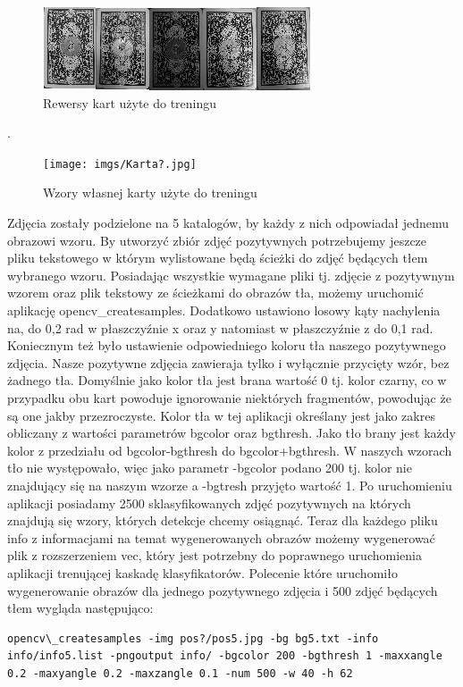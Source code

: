 \begin{figure}[H]
\centering
\includegraphics[scale=1.0]{imgs/RewersyKarty.jpg}
\caption{Rewersy kart użyte do treningu}
\label{fig:KartaRewers}
\end{figure}
.

\begin{figure}[H]
\centering
\texttt{[image: imgs/Karta?.jpg]}
\caption{Wzory własnej karty użyte do treningu}
\label{fig:KartaTajemnicza}
\end{figure}

Zdjęcia zostały podzielone na 5 katalogów, by każdy z nich odpowiadał jednemu obrazowi wzoru. By utworzyć zbiór zdjęć pozytywnych potrzebujemy jeszcze pliku tekstowego w którym wylistowane będą ścieżki do zdjęć będących tłem wybranego wzoru. Posiadając wszystkie wymagane pliki tj. zdjęcie z pozytywnym wzorem oraz plik tekstowy ze ścieżkami do obrazów tła, możemy uruchomić aplikację opencv\_createsamples. Dodatkowo ustawiono losowy kąty nachylenia na, do 0,2 rad w płaszczyźnie x oraz y natomiast w płaszczyźnie z do 0,1 rad. Koniecznym też było ustawienie odpowiedniego koloru tła naszego pozytywnego zdjęcia. Nasze pozytywne zdjęcia zawieraja tylko i wyłącznie przycięty wzór, bez żadnego tła. Domyślnie jako kolor tła jest brana wartość 0 tj. kolor czarny, co w przypadku obu kart powoduje ignorowanie niektórych fragmentów, powodując że są one jakby przezroczyste. Kolor tła w tej aplikacji określany jest jako zakres obliczany z wartości parametrów bgcolor oraz bgthresh. Jako tło brany jest każdy kolor z przedziału od bgcolor-bgthresh do bgcolor+bgthresh. W naszych wzorach tło nie występowało, więc jako parametr -bgcolor podano 200 tj. kolor nie znajdujący się na naszym wzorze a -bgtresh przyjęto wartość 1. Po uruchomieniu aplikacji posiadamy 2500 sklasyfikowanych zdjęć pozytywnych na których znajdują się wzory, których detekcje chcemy osiągnąć. Teraz dla każdego pliku info z informacjami na temat wygenerowanych obrazów możemy wygenerować plik z rozszerzeniem vec, który jest potrzebny do poprawnego uruchomienia aplikacji trenującej kaskadę klasyfikatorów.
Polecenie które uruchomiło wygenerowanie obrazów dla jednego pozytywnego zdjęcia i 500 zdjęć będących tłem wygląda następująco:
\begin{lstlisting}
opencv\_createsamples -img pos?/pos5.jpg -bg bg5.txt -info info/info5.list -pngoutput info/ -bgcolor 200 -bgthresh 1 -maxxangle 0.2 -maxyangle 0.2 -maxzangle 0.1 -num 500 -w 40 -h 62
\end{lstlisting}


